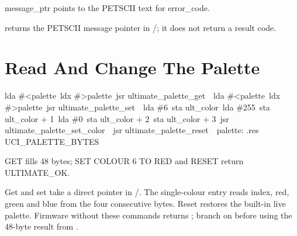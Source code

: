 \begin{resultbox}
message_ptr points to the PETSCII text for error_code.
\end{resultbox}

 returns the PETSCII message pointer in
/; it does not return a result code.


\section{Read And Change The Palette}

\begin{listingbox}
\hspace*{2em}lda \#<palette\
\hspace*{2em}ldx \#>palette\
\hspace*{2em}jsr ultimate\_palette\_get\
\
\hspace*{2em}lda \#<palette\
\hspace*{2em}ldx \#>palette\
\hspace*{2em}jsr ultimate\_palette\_set\
\
\hspace*{2em}lda \#6\
\hspace*{2em}sta ult\_color\
\hspace*{2em}lda \#255\
\hspace*{2em}sta ult\_color + 1\
\hspace*{2em}lda \#0\
\hspace*{2em}sta ult\_color + 2\
\hspace*{2em}sta ult\_color + 3\
\hspace*{2em}jsr ultimate\_palette\_set\_color\
\
\hspace*{2em}jsr ultimate\_palette\_reset\
\
palette: .res UCI\_PALETTE\_BYTES
\end{listingbox}

\begin{resultbox}
GET fills 48 bytes; SET COLOUR 6 TO RED and RESET return ULTIMATE_OK.
\end{resultbox}

Get and set take a direct pointer in /. The single-colour entry
reads index, red, green and blue from the four consecutive 
bytes. Reset restores the built-in live palette.
Firmware without these commands returns
; branch on  before using the
48-byte result from .

